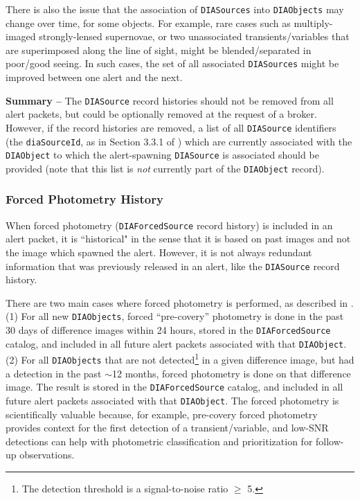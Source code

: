 \documentclass[DM,lsstdraft,authoryear,toc]{lsstdoc}
\begin{document}
There is also the issue that the association of {\tt DIASources} into {\tt DIAObjects} may change over time, for some objects.
For example, rare cases such as multiply-imaged strongly-lensed supernovae, or two unassociated transients/variables that are superimposed along the line of sight, might be blended/separated in poor/good seeing.
In such cases, the set of all associated {\tt DIASources} might be improved between one alert and the next. 

{\bf Summary --} The {\tt DIASource} record histories should not be removed from all alert packets, but could be optionally removed at the request of a broker.
However, if the record histories are removed, a list of all {\tt DIASource} identifiers (the {\tt diaSourceId}, as in Section 3.3.1 of ) which are currently associated with the {\tt DIAObject} to which the alert-spawning {\tt DIASource} is associated should be provided (note that this list is \emph{not} currently part of the {\tt DIAObject} record).

\subsubsection{Forced Photometry History}\label{sssec:packets_remove_fp}

When forced photometry ({\tt DIAForcedSource} record history) is included in an alert packet, it is ``historical" in the sense that it is based on past images and not the image which spawned the alert.
However, it is not always redundant information that was previously released in an alert, like the {\tt DIASource} record history.

There are two main cases where forced photometry is performed, as described in .
(1) For all new {\tt DIAObjects}, forced ``pre-covery'' photometry is done in the past 30 days of difference images within 24 hours, stored in the {\tt DIAForcedSource} catalog, and included in all future alert packets associated with that {\tt DIAObject}.
(2) For all {\tt DIAObjects} that are not detected\footnote{The detection threshold is a signal-to-noise ratio $\geq$ 5.} in a given difference image, but had a detection in the past $\sim$12 months, forced photometry is done on that difference image.
The result is stored in the {\tt DIAForcedSource} catalog, and included in all future alert packets associated with that {\tt DIAObject}.
The forced photometry is scientifically valuable because, for example, pre-covery forced photometry provides context for the first detection of a transient/variable, and low-SNR detections can help with photometric classification and prioritization for follow-up observations. 
\end{document}
